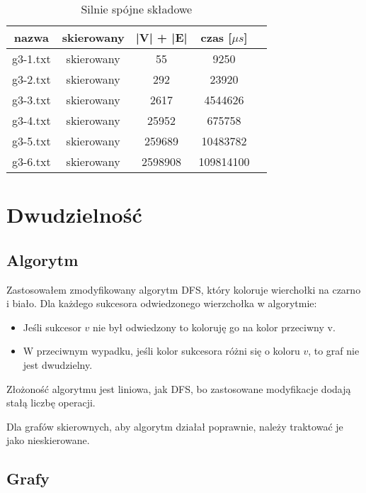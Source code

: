 \documentclass[12pt, letterpaper]{article}
\begin{document}
\begin{table}[H]\centering
    \caption{Silnie spójne składowe}
    \begin{tabular}{|c|c|c|c|c|}\hline
        nazwa    & skierowany & |V| + |E| & czas [$\mu s$] \\\hline
        g3-1.txt & skierowany & 55        & 9250      \\\hline
        g3-2.txt & skierowany & 292       & 23920     \\\hline
        g3-3.txt & skierowany & 2617      & 4544626   \\\hline
        g3-4.txt & skierowany & 25952     & 675758    \\\hline
        g3-5.txt & skierowany & 259689    & 10483782  \\\hline
        g3-6.txt & skierowany & 2598908   & 109814100 \\\hline
    \end{tabular}
\end{table}

\clearpage

\section{Dwudzielność}

\subsection{Algorytm}

Zastosowałem zmodyfikowany algorytm DFS,
który koloruje wierchołki na czarno i biało.
Dla każdego sukcesora odwiedzonego wierzchołka w algorytmie:

\begin{itemize}
    \item Jeśli sukcesor $v$ nie był odwiedzony to koloruję go na kolor
          przeciwny v.
    \item W przeciwnym wypadku, jeśli kolor sukcesora różni się o koloru $v$,
          to graf nie jest dwudzielny.
\end{itemize}

Złożoność algorytmu jest liniowa, jak DFS, bo
zastosowane modyfikacje dodają stałą liczbę operacji.

Dla grafów skierownych, aby algorytm działał poprawnie,
należy traktować je jako nieskierowane.

\subsection{Grafy}
\end{document}

